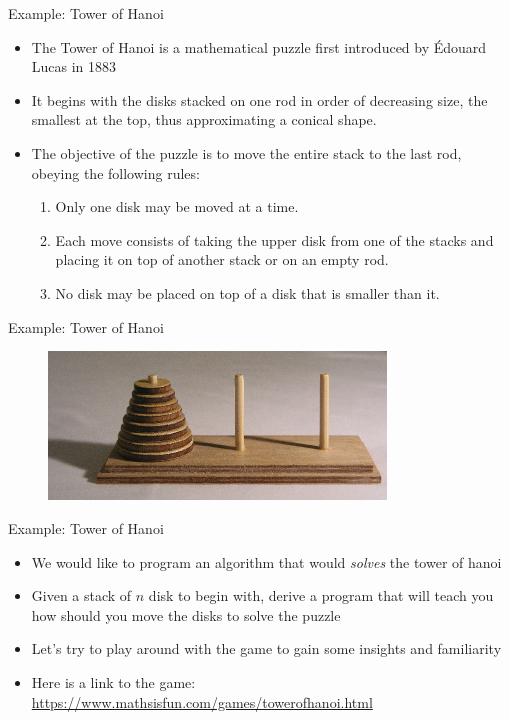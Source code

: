 \documentclass[10pt,xcolor={table,dvipsnames},t]{beamer}
\begin{document}
  
\begin{frame}{Example: Tower of Hanoi}
  \begin{itemize}
    \item The Tower of Hanoi is a mathematical puzzle first introduced by Édouard Lucas in 1883
    \item It begins with the disks stacked on one rod in order of decreasing size, the smallest at the top, thus approximating a conical shape. 
     \item The objective of the puzzle is to move the entire stack to the last rod, obeying the following rules: 
    \begin{enumerate}
      \item Only one disk may be moved at a time.
      \item Each move consists of taking the upper disk from one of the stacks and placing it on top of another stack or on an empty rod.
      \item No disk may be placed on top of a disk that is smaller than it.
    \end{enumerate}
  \end{itemize}
\end{frame}

\begin{frame}{Example: Tower of Hanoi}
\begin{figure}
\includegraphics[width=0.8\textwidth]{img/hanoi.jpeg}
\end{figure}
\end{frame}

\begin{frame}{Example: Tower of Hanoi}
\begin{itemize}
\item We would like to program an algorithm that would \textit{solves} the tower of hanoi
\item Given a stack of $n$ disk to begin with, derive a program that will teach you how should you move the disks to solve the puzzle
\item Let's try to play around with the game to gain some insights and familiarity
\item Here is a link to the game: \href{https://www.mathsisfun.com/games/towerofhanoi.html}{https://www.mathsisfun.com/games/towerofhanoi.html}
\end{itemize}
\end{frame}
\end{document}
